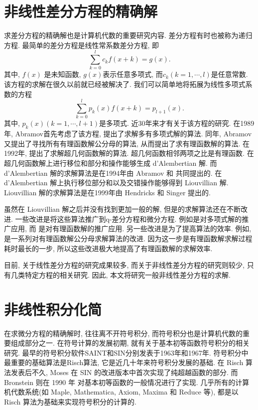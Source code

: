 \section{非线性差分方程的精确解}
求差分方程的精确解也是计算机代数的重要研究内容. 差分方程有时也被称为递归方程. 最简单的差分方程是线性常系数差分方程, 即
\begin{equation}
\sum_{k=0}^l{c_k f(x+k)}=g(x).
\label{ceq}
\end{equation}
其中, $f(x)$ 是未知函数, $g(x)$表示任意多项式, 而$c_k (k=1,\cdots,l)$是任意常数. 该方程的求解在很久以前就已经被解决了. 我们可以简单地将拓展为线性多项式系数的方程
\begin{equation}
\sum_{k=0}^l{p_k(x)f(x+k)=p_{l+1}(x)}.
\label{peq}
\end{equation}
其中, $p_k(x) (k=1,\cdots,l+1)$是多项式. 近30年来才有关于该方程的研究. 在1989年, Abramov\cite{Abramov1989polynomial}首先考虑了该方程, 提出了求解多有多项式解的算法. 同年, Abramov\cite{Abramov1989rational}又提出了寻找所有有理函数解公分母的算法, 从而提出了求有理函数解的算法. 在1992年, \Petkovsek{}\cite{petkovvsek1992hypergeometric}提出了求解超几何函数解的算法. 超几何函数相邻两项之比是有理函数. 在超几何函数解上进行移位和部分和操作能够生成 d'Alembertian 解. 而 d'Alembertian 解的求解算法是在1994年由 Abramov 和 \Petkovsek{} \cite{abramov1994dAlembertian}共同提出的. 在 d'Alembertian 解上执行移位\D 部分和以及交错操作能够得到 Liouvillian 解. Liouvillian 解的求解算法是在1999年由 Hendricks 和 Singer \cite{hendricks1999Liouvillian}提出的.

虽然在 Liouvillian 解之后并没有找到更加一般的解, 但是的求解算法还在不断改进. 一些改进是将这些算法推广到q-差分方程和微分方程. 例如是对多项式解的推广应用, 而 是对有理函数解的推广应用. 另一些改进是为了提高算法的效率. 例如,  是一系列对有理函数解公分母求解算法的改进. 因为这一步是有理函数解求解过程耗时最长的一步, 所以这些改进极大地提高了有理函数解的求解效率. 

目前, 关于线性差分方程的研究成果较多, 而关于非线性差分方程的研究则较少, 只有几类特定方程的相关研究\cite{chen2011some,ishizaki2011difference}. 因此, 本文将研究一般非线性差分方程的求解. 

\section{非线性积分化简}
在求微分方程的精确解时, 往往离不开符号积分, 而符号积分也是计算机代数的重要组成部分之一. 在符号计算的发展初期, 就有关于基本初等函数符号积分的相关研究. 最早的符号积分软件SAINT和SIN分别发表于1963年\cite{slagle1963}和1967年\cite{moses1967}. 符号积分中最重要的基础算法是Risch算法\cite{risch1969,risch1970}, 它是近几十年来符号积分发展的基础. 在 Risch 算法发表后不久, Moses 在 SIN 的改进版本中首次实现了纯超越函数的部分\cite{moses1971}. 而 Bronstein 则在 1990 年\cite{bronstein1990} 对基本初等函数的一般情况进行了实现. 几乎所有的计算机代数系统(如 Maple, Mathematica, Axiom, Maxima 和 Reduce 等), 都是以 Risch 算法为基础来实现符号积分的计算的. 

